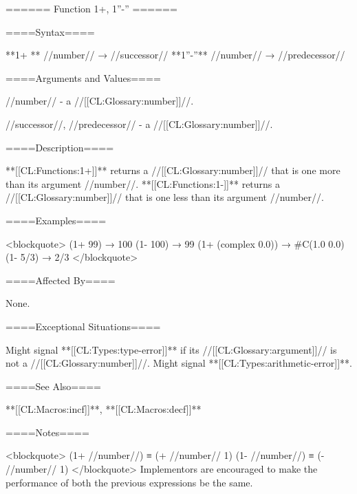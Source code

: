 ====== Function 1+, 1''-'' ======

====Syntax====

**1+ ** //number// → //successor// **1''-''** //number// → //predecessor//

====Arguments and Values====

//number// - a //[[CL:Glossary:number]]//.

//successor//, //predecessor// - a //[[CL:Glossary:number]]//.

====Description====

**[[CL:Functions:1+]]** returns a //[[CL:Glossary:number]]// that is one more than its argument //number//. **[[CL:Functions:1-]]** returns a //[[CL:Glossary:number]]// that is one less than its argument //number//.

====Examples====

<blockquote> (1+ 99) → 100 (1- 100) → 99 (1+ (complex 0.0)) → #C(1.0 0.0) (1- 5/3) → 2/3 </blockquote>

====Affected By====

None.

====Exceptional Situations====

Might signal **[[CL:Types:type-error]]** if its //[[CL:Glossary:argument]]// is not a //[[CL:Glossary:number]]//. Might signal **[[CL:Types:arithmetic-error]]**.

====See Also====

**[[CL:Macros:incf]]**, **[[CL:Macros:decf]]**

====Notes====

<blockquote> (1+ //number//) ≡ (+ //number// 1) (1- //number//) ≡ (- //number// 1) </blockquote> Implementors are encouraged to make the performance of both the previous expressions be the same.

